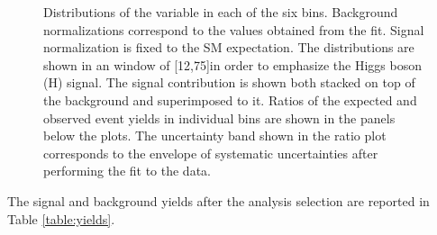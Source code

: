 \begin{figure}[htbp]
{}
\caption{Distributions of the \mt variable in each of the six \pth{} bins. Background normalizations correspond to the values obtained from the fit. Signal normalization is fixed to the SM expectation. The distributions are shown in an \mll window of [12,75]\GeV in order to emphasize the Higgs boson (H) signal. The signal contribution is shown both stacked on top of the background and superimposed to it. Ratios of the expected and observed event yields in individual bins are shown in the panels below the plots. The uncertainty band shown in the ratio plot corresponds to the envelope of systematic uncertainties after performing the fit to the data.}\label{fig:mTSignalRegion}
\end{figure}

The signal and background yields after the analysis selection are reported in Table \ref{table:yields}.

